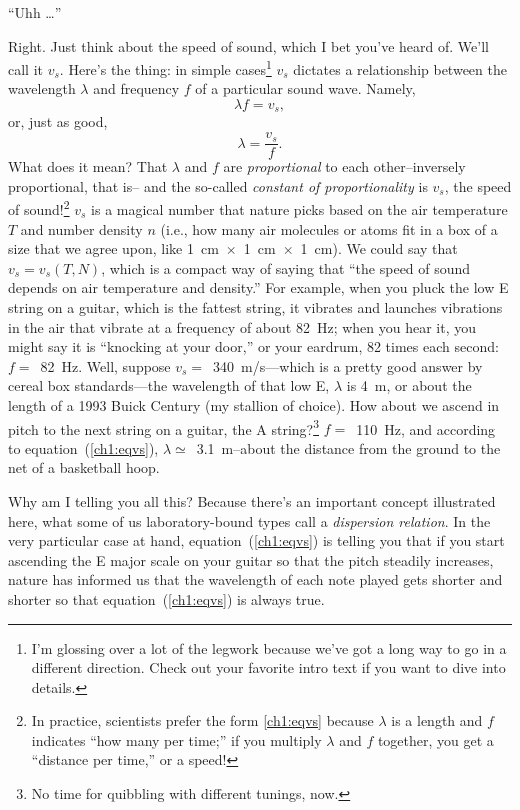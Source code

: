 \X ``Uhh \dots''


Right. Just think about the speed of sound, which I bet you've heard
of. We'll call it $v_s$. Here's the thing: in simple
cases\footnote{I'm glossing over a lot of the legwork because we've
  got a long way to go in a different direction. Check out your
  favorite intro text if you want to dive into details.}  $v_s$
dictates a relationship between the wavelength $\lambda$ and frequency
$f$ of a particular sound wave. Namely,
\begin{equation}
  \label{ch1:eqvs}
  \lambda f = v_s,
\end{equation}
or, just as good,
\begin{equation}
  \label{ch1:eqvsdiff}
  \lambda = \dfrac{v_s}{f}.
\end{equation}
What does it mean? That $\lambda$ and $f$ are \emph{proportional} to
each other--inversely proportional, that is-- and the so-called
\emph{constant of proportionality} is $v_s$, the speed of
sound!\footnote{In practice, scientists prefer the form \ref{ch1:eqvs}
  because $\lambda$ is a length and $f$ indicates ``how many per
  time;'' if you multiply $\lambda$ and $f$ together, you get a
  ``distance per time,'' or a speed!} $v_s$ is a magical number that
nature picks based on the air temperature $T$ and number density $n$
(i.e., how many air molecules or atoms fit in a box of a size that we
agree upon, like 1~cm~$\times$~1~cm~$\times$~1~cm). We could say that
$v_s = v_s (T, N)$, which is a compact way of saying that ``the speed
of sound depends on air temperature and density.'' For example, when
you pluck the low E string on a guitar, which is the fattest string,
it vibrates and launches vibrations in the air that vibrate at a
frequency of about 82~Hz; when you hear it, you might say it is
``knocking at your door,'' or your eardrum, 82 times each second: $f =
$~82~Hz. Well, suppose $v_s =$~340~m/s---which is a pretty good answer
by cereal box standards---the wavelength of that low E, $\lambda$ is
4~m, or about the length of a 1993 Buick Century (my stallion of
choice). How about we ascend in pitch to the next string on a guitar,
the A string?\footnote{No time for quibbling with different tunings,
  now.} $f = $~110~Hz, and according to equation~(\ref{ch1:eqvs}),
$\lambda \simeq$~3.1~m--about the distance from the ground to the net
of a basketball hoop.

Why am I telling you all this? Because there's an important concept
illustrated here, what some of us laboratory-bound types call a
\emph{dispersion relation}. In the very particular case at hand,
equation~(\ref{ch1:eqvs}) is telling you that if you start ascending
the E major scale on your guitar so that the pitch steadily increases,
nature has informed us that the wavelength of each note played gets
shorter and shorter so that equation~(\ref{ch1:eqvs}) is always true.

